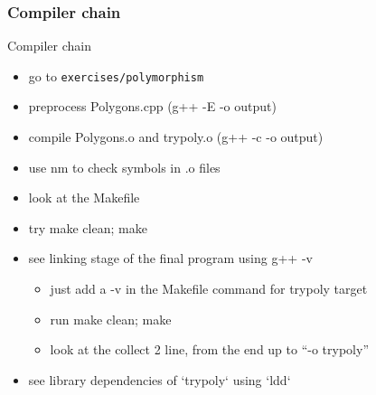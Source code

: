 \begin{frame}[fragile]
  \frametitle{Compiler chain}
  \begin{exercise}{Compiler chain}
    \begin{itemize}
    \item go to \texttt{exercises/polymorphism}
    \item preprocess Polygons.cpp (g++ -E -o output)
    \item compile Polygons.o and trypoly.o (g++ -c -o output)
    \item use nm to check symbols in .o files
    \item look at the Makefile
    \item try make clean; make
    \item see linking stage of the final program using g++ -v
      \begin{itemize}
      \item just add a -v in the Makefile command for trypoly target
      \item run make clean; make
      \item look at the collect 2 line, from the end up to ``-o trypoly''
      \end{itemize}
    \item see library dependencies of `trypoly` using `ldd`
    \end{itemize}
  \end{exercise}
\end{frame}
